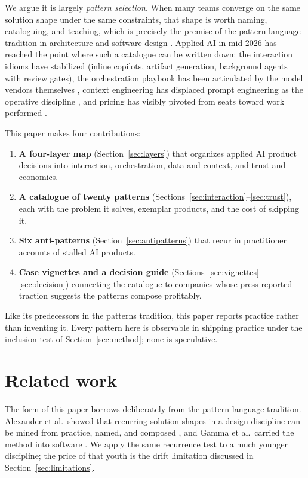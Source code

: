 \documentclass[11pt]{article}
\begin{document}
We argue it is largely \emph{pattern selection}. When many teams converge on
the same solution shape under the same constraints, that shape is
worth naming, cataloguing, and teaching, which is precisely the premise of the
pattern-language tradition in architecture \citep{alexander1977pattern} and
software design \citep{gamma1995design}. Applied AI in mid-2026 has reached the
point where such a catalogue can be written down: the interaction idioms have
stabilized (inline copilots, artifact generation, background agents with review
gates), the orchestration playbook has been articulated by the model vendors
themselves \citep{anthropic2024agents, openai2025agentsguide}, context
engineering has displaced prompt engineering as the operative discipline
\citep{anthropic2025context, sourcegraph2026context}, and pricing has visibly
pivoted from seats toward work performed \citep{bvp2026pricing,
sierra2024outcomes}.

This paper makes four contributions:

\begin{enumerate}
  \item \textbf{A four-layer map} (Section~\ref{sec:layers}) that organizes
  applied AI product decisions into interaction, orchestration, data and
  context, and trust and economics.
  \item \textbf{A catalogue of twenty patterns}
  (Sections~\ref{sec:interaction}--\ref{sec:trust}), each with the problem it
  solves, exemplar products, and the cost of skipping it.
  \item \textbf{Six anti-patterns} (Section~\ref{sec:antipatterns}) that
  recur in practitioner accounts of stalled AI products.
  \item \textbf{Case vignettes and a decision guide}
  (Sections~\ref{sec:vignettes}--\ref{sec:decision}) connecting the catalogue
  to companies whose press-reported traction suggests the patterns compose
  profitably.
\end{enumerate}

Like its predecessors in the patterns tradition, this paper reports practice
rather than inventing it. Every pattern here is observable in shipping
practice under the inclusion test of Section~\ref{sec:method}; none is
speculative.

\section{Related work}
\label{sec:related}

The form of this paper borrows deliberately from the pattern-language
tradition. Alexander et al.\ showed that recurring solution shapes in a
design discipline can be mined from practice, named, and composed
\citep{alexander1977pattern}, and Gamma et al.\ carried the method into
software \citep{gamma1995design}. We apply the same recurrence test to a much
younger discipline; the price of that youth is the drift limitation discussed
in Section~\ref{sec:limitations}.
\end{document}
